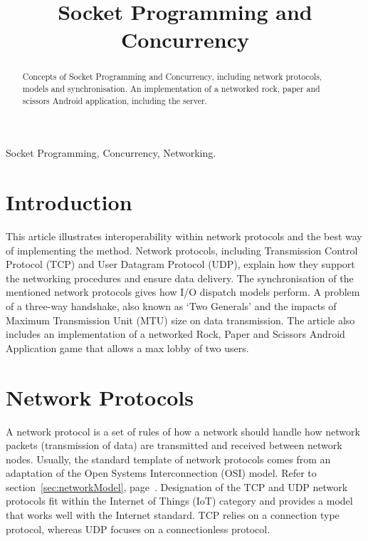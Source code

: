 \documentclass[conference]{IEEEtran}
\begin{document}
	\title{Socket Programming and Concurrency}

	\author{
	}

     \maketitle
    
    \thispagestyle{plain}
    \pagestyle{plain}
    
    \begin{abstract}
      Concepts of Socket Programming and Concurrency, including network protocols, models and synchronisation. An implementation of a networked rock, paper and scissors Android application, including the server.
    \end{abstract}

    \begin{IEEEkeywords}
        Socket Programming, Concurrency, Networking.
    \end{IEEEkeywords}

    \section{Introduction}
      This article illustrates interoperability within network protocols and the best way of implementing the method. Network protocols, including Transmission Control Protocol (TCP) and User Datagram Protocol (UDP), explain how they support the networking procedures and ensure data delivery. The synchronisation of the mentioned network protocols gives how I/O dispatch models perform. A problem of a three-way handshake, also known as `Two Generals' and the impacts of Maximum Transmission Unit (MTU) size on data transmission. The article also includes an implementation of a networked Rock, Paper and Scissors Android Application game that allows a max lobby of two users.

    \section{Network Protocols}
      A network protocol is a set of rules of how a network should handle how network packets (transmission of data) are transmitted and received between network nodes. Usually, the standard template of network protocols comes from an adaptation of the Open Systems Interconnection (OSI) model. Refer to section~\ref{sec:networkModel}, page~\pageref{sec:networkModel}. Designation of the TCP and UDP network protocols fit within the Internet of Things (IoT) category and provides a model that works well with the Internet standard. TCP relies on a connection type protocol, whereas UDP focuses on a connectionless protocol.
\end{document}
